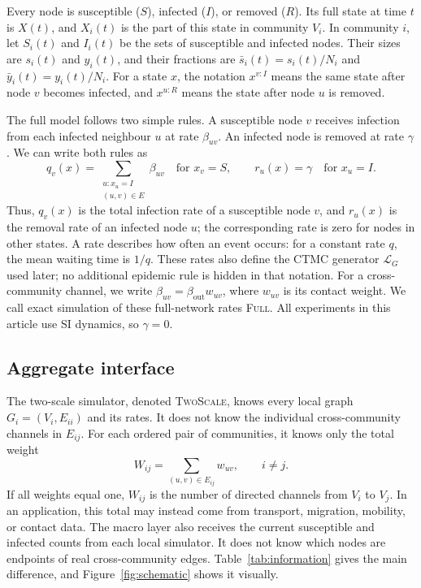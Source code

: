 \documentclass[a4paper,fleqn]{cas-sc}
\newcommand{\ibar}{\bar{y}}
\newcommand{\sbar}{\bar{s}}
\newcommand{\Full}{\textup{\textsc{Full}}}
\newcommand{\TS}{\textup{\textsc{TwoScale}}}
\begin{document}
Every node is susceptible ($S$), infected ($I$), or removed ($R$). Its full state at time $t$ is $X(t)$, and $X_i(t)$ is the part of this state in community $V_i$. In community $i$, let $S_i(t)$ and $I_i(t)$ be the sets of susceptible and infected nodes. Their sizes are $s_i(t)$ and $y_i(t)$, and their fractions are $\sbar_i(t)=s_i(t)/N_i$ and $\ibar_i(t)=y_i(t)/N_i$. For a state $x$, the notation $x^{v:I}$ means the same state after node $v$ becomes infected, and $x^{u:R}$ means the state after node $u$ is removed.

The full model follows two simple rules. A susceptible node $v$ receives infection from each infected neighbour $u$ at rate $\beta_{uv}$. An infected node is removed at rate $\gamma$. We can write both rules as
\begin{equation}
\label{eq:full_generator}
q_v(x)=\sum_{\substack{u:x_u=I\\(u,v)\in E}}\beta_{uv}
\quad\text{for }x_v=S,
\qquad
r_u(x)=\gamma
\quad\text{for }x_u=I.
\end{equation}
Thus, $q_v(x)$ is the total infection rate of a susceptible node $v$, and $r_u(x)$ is the removal rate of an infected node $u$; the corresponding rate is zero for nodes in other states. A rate describes how often an event occurs: for a constant rate $q$, the mean waiting time is $1/q$. These rates also define the CTMC generator $\mathcal{L}_G$ used later; no additional epidemic rule is hidden in that notation. For a cross-community channel, we write $\beta_{uv}=\beta_{\mathrm{out}}w_{uv}$, where $w_{uv}$ is its contact weight. We call exact simulation of these full-network rates \Full{}. All experiments in this article use SI dynamics, so $\gamma=0$.

\subsection{Aggregate interface}
\label{sec:interface}

The two-scale simulator, denoted \TS{}, knows every local graph $G_i=(V_i,E_{ii})$ and its rates. It does not know the individual cross-community channels in $E_{ij}$. For each ordered pair of communities, it knows only the total weight
\begin{equation}
\label{eq:weight}
W_{ij}=\sum_{(u,v)\in E_{ij}}w_{uv},
\qquad i\neq j.
\end{equation}
If all weights equal one, $W_{ij}$ is the number of directed channels from $V_i$ to $V_j$. In an application, this total may instead come from transport, migration, mobility, or contact data. The macro layer also receives the current susceptible and infected counts from each local simulator. It does not know which nodes are endpoints of real cross-community edges. Table~\ref{tab:information} gives the main difference, and Figure~\ref{fig:schematic} shows it visually.
\end{document}
